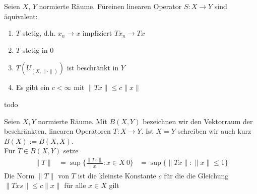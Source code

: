 \begin{satz}
	Seien $X$, $Y$ normierte Räume. Füreinen linearen Operator $S: X \rightarrow Y$ sind äquivalent:
	\begin{enumerate}[label=\alph*\upshape)]
		\item $T$ stetig, d.h. $x_{n} \rightarrow x$ impliziert $Tx_{n} \rightarrow Tx$
		\item $T$ stetig in 0
		\item $T(U_{(X, \| \cdot \|)})$ ist beschränkt in $Y$
		\item Es gibt ein $c < \infty$ mit $\| Tx \| \leq c \| x \|$
	\end{enumerate}	
\end{satz}
\begin{beweis}
 todo	
\end{beweis}

\begin{definition}
	Seien $X, Y$ normierte Räume. Mit $B(X, Y)$ bezeichnen wir den Vektorraum der beschränkten, linearen Operatoren $T: X \rightarrow Y$. Ist $ X = Y$ schreiben wir auch kurz $B(X) := B(X, X)$. \\
	
	Für $T \in B(X, Y)$ setze
	\begin{align*}
		\| T \| & = \sup \{ \frac{\| Tx \|}{\| x \|}: x \in X \ {0} \}
				& = \sup \{ \| Tx \|: \| x \| \leq 1 \}
	\end{align*}
	Die Norm $\| T \|$ von $T$ ist die kleinste Konstante $c$ für die die Gleichung $\| Tx s\| \leq c \| x \|$ für alle $x \in X$ gilt
\end{definition}

\begin{satz}
 	
\end{satz}












